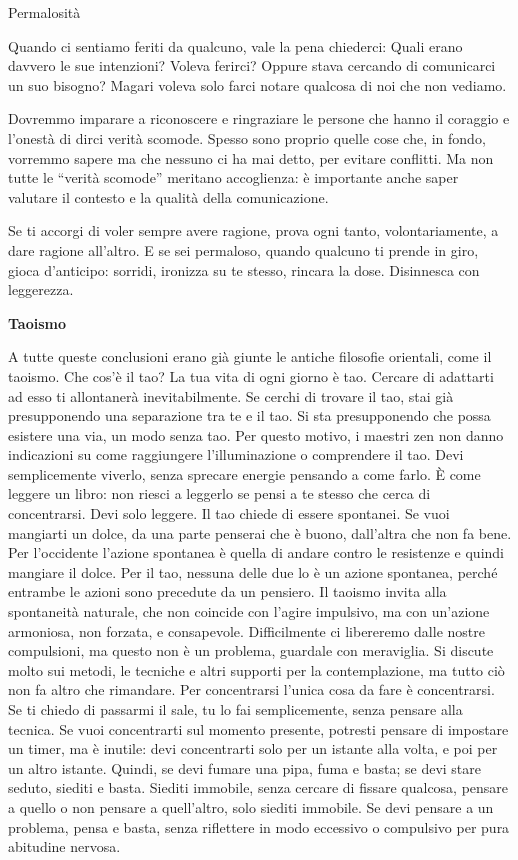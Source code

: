\documentclass[12pt]{book} %
\begin{document}
\begin{mdframed}[linewidth=1pt]
Permalosità

Quando ci sentiamo feriti da qualcuno, vale la pena chiederci: Quali erano davvero le sue intenzioni?
Voleva ferirci? Oppure stava cercando di comunicarci un suo bisogno? Magari voleva solo farci notare qualcosa di noi che non vediamo.

Dovremmo imparare a riconoscere e ringraziare le persone che hanno il coraggio e l’onestà di dirci verità scomode. Spesso sono proprio quelle cose che, in fondo, vorremmo sapere ma che nessuno ci ha mai detto, per evitare conflitti. Ma non tutte le “verità scomode” meritano accoglienza: è importante anche saper valutare il contesto e la qualità della comunicazione.

Se ti accorgi di voler sempre avere ragione, prova ogni tanto, volontariamente, a dare ragione all’altro.
E se sei permaloso, quando qualcuno ti prende in giro, gioca d’anticipo: sorridi, ironizza su te stesso, rincara la dose. Disinnesca con leggerezza.
\end{mdframed}

\textbf{Taoismo}

A tutte queste conclusioni erano già giunte le antiche filosofie orientali, come il taoismo.
Che cos'è il tao? La tua vita di ogni giorno è tao. Cercare di adattarti ad esso ti allontanerà inevitabilmente. Se cerchi di trovare il tao, stai già presupponendo una separazione tra te e il tao. Si sta presupponendo che possa esistere una via, un modo senza tao. Per questo motivo, i maestri zen non danno indicazioni su come raggiungere l'illuminazione o comprendere il tao. Devi semplicemente viverlo, senza sprecare energie pensando a come farlo. È come leggere un libro: non riesci a leggerlo se pensi a te stesso che cerca di concentrarsi. Devi solo leggere.
Il tao chiede di essere spontanei. Se vuoi mangiarti un dolce, da una parte penserai che è buono, dall'altra che non fa bene. Per l'occidente l'azione spontanea è quella di andare contro le resistenze e quindi mangiare il dolce. Per il tao, nessuna delle due lo è un azione spontanea, perché entrambe le azioni sono precedute da un pensiero. Il taoismo invita alla spontaneità naturale, che non coincide con l’agire impulsivo, ma con un'azione armoniosa, non forzata, e consapevole. Difficilmente ci libereremo dalle nostre compulsioni, ma questo non è un problema, guardale con meraviglia.
Si discute molto sui metodi, le tecniche e altri supporti per la contemplazione, ma tutto ciò non fa altro che rimandare. Per concentrarsi l'unica cosa da fare è concentrarsi. Se ti chiedo di passarmi il sale, tu lo fai semplicemente, senza pensare alla tecnica. Se vuoi concentrarti sul momento presente, potresti pensare di impostare un timer, ma è inutile: devi concentrarti solo per un istante alla volta, e poi per un altro istante. Quindi, se devi fumare una pipa, fuma e basta; se devi stare seduto, siediti e basta. Siediti immobile, senza cercare di fissare qualcosa, pensare a quello o non pensare a quell'altro, solo siediti immobile. Se devi pensare a un problema, pensa e basta, senza riflettere in modo eccessivo o compulsivo per pura abitudine nervosa.
\end{document}

